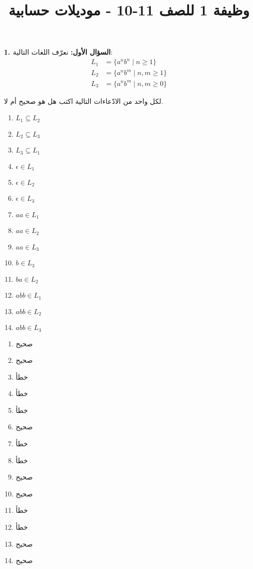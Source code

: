 \documentclass[12pt]{article}
\title{وظيفة 1 للصف 11-10 - موديلات حسابية}
\begin{document}
\maketitle

\textbf{1. السؤال الأول:} نعرّف اللغات التالية:
\begin{align*}
    L_1 &= \{a^n b^n \mid n \geq 1\} \\
    L_2 &= \{a^n b^m \mid n,m \geq 1\} \\
    L_3 &= \{a^n b^m \mid n,m \geq 0\}
\end{align*}

لكل واحد من الادّعاءات التالية اكتب هل هو صحيح أم لا.
\begin{enumerate}
\item $L_1 \subseteq L_2$
\item $L_2 \subseteq L_3$
\item $L_3 \subseteq L_1$
\item $\epsilon \in L_1$
\item $\epsilon \in L_2$
\item $\epsilon \in L_3$
\item $aa \in L_1$
\item $aa \in L_2$
\item $aa \in L_3$
\item $b \in L_3$
\item $ba \in L_2$
\item $abb \in L_1$
\item $abb \in L_2$
\item $abb \in L_3$
\end{enumerate}

\ifwithsols
\clearpage
\begin{solution}
\begin{enumerate}
\item صحيح
\item صحيح
\item خطأ
\item خطأ
\item خطأ
\item صحيح
\item خطأ
\item خطأ
\item صحيح
\item صحيح
\item خطأ
\item خطأ
\item صحيح
\item صحيح
\end{enumerate}
\end{solution}
\fi
\end{document}
